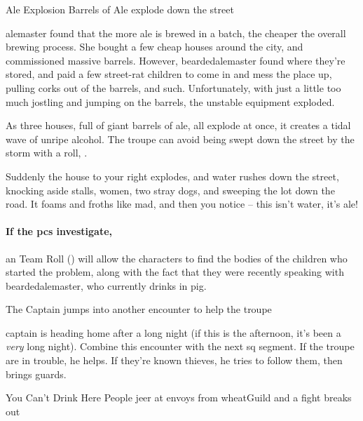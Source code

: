 {Ale Explosion}%
{Barrels of Ale explode down the street}%

\Gls{alemaster} found that the more ale is brewed in a batch, the cheaper the overall brewing process.
She bought a few cheap houses around the city, and commissioned massive barrels.
However, \gls{beardedalemaster} found where they're stored, and paid a few street-rat children to come in and mess the place up, pulling corks out of the barrels, and such.
Unfortunately, with just a little too much jostling and jumping on the barrels, the unstable equipment exploded.

As three houses, full of giant barrels of ale, all explode at once, it creates a tidal wave of unripe alcohol.
The troupe can avoid being swept down the street by the storm with a  roll, \tn[8].

\begin{boxtext}
  Suddenly the house to your right explodes, and water rushes down the street, knocking aside stalls, women, two stray dogs, and sweeping the lot down the road.  It foams and froths like mad, and then you notice -- this isn't water, it's ale!
\end{boxtext}

\paragraph{If the \glspl{pc} investigate,}
an  Team Roll (\tn[10]) will allow the characters to find the bodies of the children who started the problem, along with the fact that they were recently speaking with \gls{beardedalemaster}, who currently drinks in \gls{pig}.%
\iftoggle{core}%
{\footnote{See the Core Rules, \autopageref{teamwork}, for Team Rolls.}}%
{}%

{\squash The Captain}%
{ jumps into another encounter to help the troupe}%

\Gls{captain} is heading home after a long night (if this is the afternoon, it's been a \emph{very} long night).
Combine this encounter with the next \gls{sq} \gls{segment}.
If the troupe are in trouble, he helps.
If they're known thieves, he tries to follow them, then brings guards.

\captain


{You Can't Drink Here}%
{People jeer at envoys from  \gls{wheatGuild} and a fight breaks out}%

